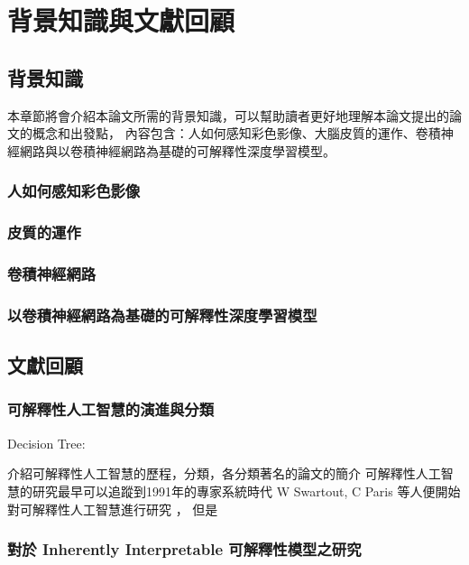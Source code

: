 \documentclass[class=NCU_thesis, crop=false]{standalone}
\begin{document}
\chapter{背景知識與文獻回顧}
\section{背景知識}

本章節將會介紹本論文所需的背景知識，可以幫助讀者更好地理解本論文提出的論文的概念和出發點，
內容包含：人如何感知彩色影像、大腦皮質的運作、卷積神經網路與以卷積神經網路為基礎的可解釋性深度學習模型。

\subsection{人如何感知彩色影像}




\subsection{皮質的運作}

\subsection{卷積神經網路}

\subsection{以卷積神經網路為基礎的可解釋性深度學習模型}

\section{文獻回顧}

\subsection{可解釋性人工智慧的演進與分類}
Decision Tree:
\cite{rokach2016decision}
\cite{grinsztajn2022treebased}

介紹可解釋性人工智慧的歷程，分類，各分類著名的論文的簡介
可解釋性人工智慧的研究最早可以追蹤到1991年的專家系統時代 W Swartout, C Paris 等人便開始對可解釋性人工智慧進行研究 \cite{87686}，
但是

\subsection{對於 Inherently Interpretable 可解釋性模型之研究}
\end{document}
